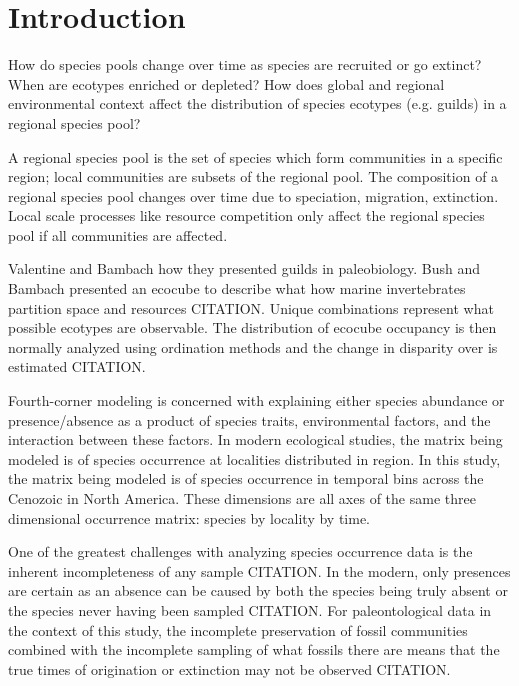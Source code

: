 \documentclass[12pt,letterpaper]{article}
\begin{document}
\section*{Introduction}


How do species pools change over time as species are recruited or go extinct? When are ecotypes enriched or depleted? How does global and regional environmental context affect the distribution of species ecotypes (e.g. guilds) in a regional species pool?

A regional species pool is the set of species which form communities in a specific region; local communities are subsets of the regional pool. The composition of a regional species pool changes over time due to speciation, migration, extinction. Local scale processes like resource competition only affect the regional species pool if all communities are affected.

Valentine and Bambach how they presented guilds in paleobiology. Bush and Bambach presented an ecocube to describe what how marine invertebrates partition space and resources CITATION. Unique combinations represent what possible ecotypes are observable. The distribution of ecocube occupancy is then normally analyzed using ordination methods and the change in disparity over is estimated CITATION.

Fourth-corner modeling is concerned with explaining either species abundance or presence/absence as a product of species traits, environmental factors, and the interaction between these factors. In modern ecological studies, the matrix being modeled is of species occurrence at localities distributed in region. In this study, the matrix being modeled is of species occurrence in temporal bins across the Cenozoic in North America. These dimensions are all axes of the same three dimensional occurrence matrix: species by locality by time.

One of the greatest challenges with analyzing species occurrence data is the inherent incompleteness of any sample CITATION. In the modern, only presences are certain as an absence can be caused by both the species being truly absent or the species never having been sampled CITATION. For paleontological data in the context of this study, the incomplete preservation of fossil communities combined with the incomplete sampling of what fossils there are means that the true times of origination or extinction may not be observed CITATION.
\end{document}
